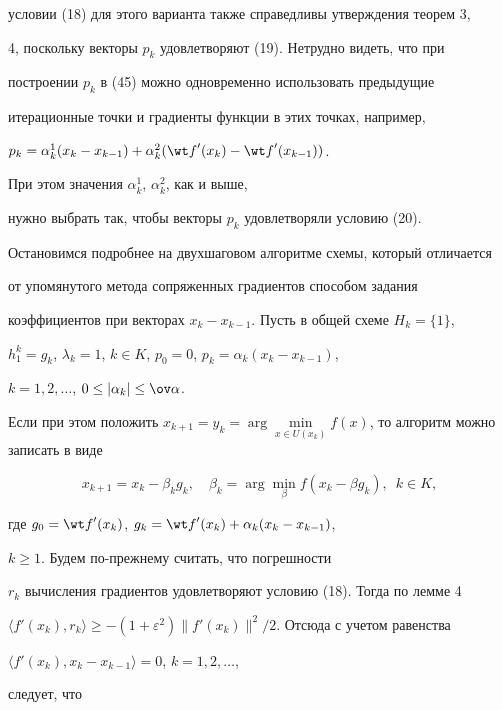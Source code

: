 условии (18) для этого варианта также справедливы утверждения теорем 3,


4, поскольку векторы $p_k$ удовлетворяют (19). Нетрудно видеть, что при


построении $p_k$ в (45) можно одновременно использовать предыдущие


итерационные точки и градиенты функции в этих точках, например,


$p_k=\alpha_k^1(x_k-x_{k-1})+\alpha_k^2({\wt f}'(x_k)-{\wt f}'(x_{k-1}))$.


При этом значения $\alpha_k^1$, $\alpha_k^2$, как и выше,


нужно выбрать так, чтобы векторы $p_k$ удовлетворяли условию (20).





Остановимся подробнее на двухшаговом алгоритме схемы, который отличается


от упомянутого метода сопряженных градиентов способом задания


коэффициентов при векторах $x_k-x_{k-1}$. Пусть в общей схеме $H_k=\{1\}$,


$h_1^k=g_k$, $\lambda_k=1$, $k\in K$, $p_0=0$, $p_k=\alpha_k(x_k-x_{k-1})$,


$k=1,2,\dotsc$, $0\le |{\alpha_k} |\le\ov\alpha$.


Если при этом положить $x_{k+1}=y_k=\arg\min\limits_{x\in


U(x_k)}f(x)$, то алгоритм можно записать в виде


\begin{equation}


x_{k+1}=x_k-\beta_kg_k,\quad\beta_k=


\arg\min_{\beta}f(x_k-\beta g_k),\ \; k\in K,


\end{equation}


где $g_0={\wt f}'(x_k)$, $g_k={\wt f}'(x_k)+\alpha_k(x_k-x_{k-1})$,


$k\ge 1$. Будем по-прежнему считать, что погрешности


$r_k$ вычисления градиентов удовлетворяют условию (18). Тогда по лемме 4


$\langle {{f}'(x_k),r_k}\rangle\ge -(1+\varepsilon^2)


\|{{f}'(x_k)}\|^2/2$. Отсюда с учетом равенства


$\langle {{f}'(x_k),x_k-x_{k-1}}\rangle =0$, $k=1,2,\dotsc$,


следует, что


